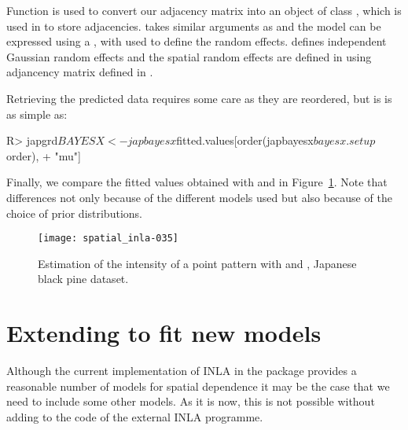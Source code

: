 \documentclass[article]{jss}
\begin{document}
\noindent
Function  is used to convert our adjacency matrix into
an object of class , which is used in  to store 
adjacencies.  takes similar arguments as 
and the model can be expressed using a , with 
used to define the random effects.  defines
independent Gaussian random effects and  the spatial random effects
are defined in 
 using adjancency matrix defined in .

Retrieving the predicted data requires some care as they are reordered,
but is is as simple as:
\begin{Schunk}
\begin{Sinput}
R> japgrd$BAYESX<-japbayesx$fitted.values[order(japbayesx$bayesx.setup$order),
+     "mu"]
\end{Sinput}
\end{Schunk}
\noindent
Finally, we compare the fitted values obtained with  and
 in Figure~\ref{fig:inlabayesx}. Note that differences not only
because of the different models used but also because of the choice of
prior distributions.



\begin{figure}[h]
\begin{center}
\texttt{[image: spatial\_inla-035]}
\caption{Estimation of the intensity of a point pattern with  and , Japanese black pine dataset.}
\label{fig:inlabayesx}
\end{center}
\end{figure}





\section[Extending {R-INLA} to fit new models]{Extending  to fit new models} 

\label{sec:extINLA}


Although the current implementation of INLA in the  package
provides a reasonable number of models for spatial dependence it may be the
case that we need to include some other models. As it is now, this is not
possible without adding to the code of the external INLA programme.
\end{document}
